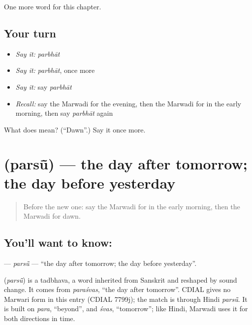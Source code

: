 \begin{grammarlens}[title={What you've built}]
One more word for this chapter.
\end{grammarlens}

\subsection*{Your turn}
\begin{itemize}
\raggedright
  \item \emph{Say it:} \emph{parbhāt}
  \item \emph{Say it:} \emph{parbhāt}, once more
  \item \emph{Say it:} say \emph{parbhāt}
  \item \emph{Recall:} say the Marwadi for the evening, then the Marwadi for in the early morning, then say \emph{parbhāt} again
\end{itemize}

\begin{tcolorbox}[breakable,colback=teal!4,colframe=teal!35!black,title={Before you move on}]
What does  mean? (\textquotedblleft{}Dawn\textquotedblright{}.) Say it once more.
\end{tcolorbox}
\section[\texorpdfstring{\mw{परसूं} (parsū̃)}{परसूं (parsū̃)}]{ (parsū̃) — the day after tomorrow; the day before yesterday}

\label{lesson:MW-C90-parsu}



\begin{quote}
Before the new one: say the Marwadi for in the early morning, then the Marwadi for dawn.
\end{quote}

\subsection*{You'll want to know: }
\textbf{} — \emph{parsū̃} — \textquotedblleft{}the day after tomorrow; the day before yesterday\textquotedblright{}.

\begin{cousinweb}
\textbf{} (\emph{parsū̃}) is a tadbhava, a word inherited from Sanskrit and reshaped by sound change. It comes from \emph{paraśvas}, \textquotedblleft{}the day after tomorrow\textquotedblright{}. CDIAL gives no Marwari form in this entry (CDIAL 7799j); the match is through Hindi \emph{parsū̃}. It is built on \emph{para}, \textquotedblleft{}beyond\textquotedblright{}, and \emph{śvas}, \textquotedblleft{}tomorrow\textquotedblright{}; like Hindi, Marwadi uses it for both directions in time.
\end{cousinweb}

